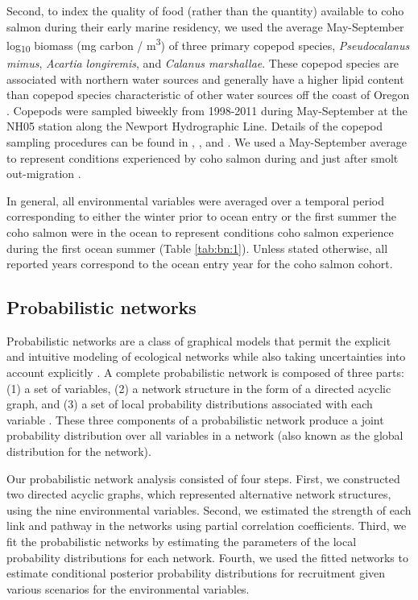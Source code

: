 Second, to index the quality of food (rather than the quantity) available to
coho salmon during their early marine residency, we used the average
May-September log\textsubscript{10} biomass (mg carbon / m\textsuperscript{3})
of three primary copepod species, \emph{Pseudocalanus mimus}, \emph{Acartia
longiremis}, and \emph{Calanus marshallae}. These copepod species are associated
with northern water sources and generally have a higher lipid content than
copepod species characteristic of other water sources off the coast of Oregon
\citep{Lee2006, Hooff2006a}. Copepods were sampled biweekly from 1998-2011
during May-September at the NH05 station along the Newport Hydrographic Line.
Details of the copepod sampling procedures can be found in \citet{Lamb2005a},
\citet{Peterson2003a}, and \citet{Bi2011b}.  We used a May-September average to
represent conditions experienced by coho salmon during and just after smolt
out-migration \citep{Bi2011a}.

In general, all environmental variables were averaged over a temporal period
corresponding to either the winter prior to ocean entry or the first summer the
coho salmon were in the ocean to represent conditions coho salmon experience
during the first ocean summer (Table \ref{tab:bn:1}). Unless stated otherwise, all reported
years correspond to the ocean entry year for the coho salmon cohort.


\subsection{Probabilistic networks}

Probabilistic networks are a class of graphical models that permit the explicit
and intuitive modeling of ecological networks while also taking uncertainties
into account explicitly \citep{Pearl1988a, Varis1995a}. A complete probabilistic
network is composed of three parts: (1) a set of variables, (2) a network
structure in the form of a directed acyclic graph, and (3) a set of local
probability distributions associated with each variable \citep{Heckerman1996a}.
These three components of a probabilistic network produce a joint probability
distribution over all variables in a network (also known as the global
distribution for the network).

Our probabilistic network analysis consisted of four steps. First, we
constructed two directed acyclic graphs, which represented alternative network
structures, using the nine environmental variables. Second, we estimated the
strength of each link and pathway in the networks using partial correlation
coefficients. Third, we fit the probabilistic networks by estimating the
parameters of the local probability distributions for each network. Fourth, we
used the fitted networks to estimate conditional posterior probability
distributions for recruitment given various scenarios for the environmental
variables.


